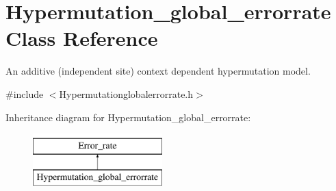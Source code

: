 \hypertarget{classHypermutation__global__errorrate}{}\section{Hypermutation\+\_\+global\+\_\+errorrate Class Reference}
\label{classHypermutation__global__errorrate}


An additive (independent site) context dependent hypermutation model.  




{\ttfamily \#include $<$Hypermutationglobalerrorrate.\+h$>$}

Inheritance diagram for Hypermutation\+\_\+global\+\_\+errorrate\+:\begin{figure}[H]
\begin{center}
\leavevmode
\includegraphics[height=2.000000cm]{d3/da5/classHypermutation__global__errorrate}
\end{center}
\end{figure}

